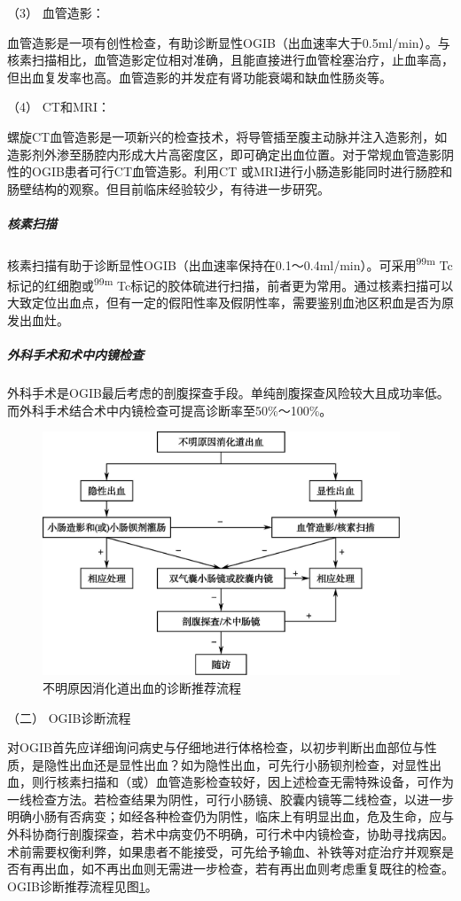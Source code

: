 \hypertarget{text00034.htmlux5cux23CHP1-13-3-1-1-3-3}{}
（3） 血管造影：

血管造影是一项有创性检查，有助诊断显性OGIB（出血速率大于0.5ml/min）。与核素扫描相比，血管造影定位相对准确，且能直接进行血管栓塞治疗，止血率高，但出血复发率也高。血管造影的并发症有肾功能衰竭和缺血性肠炎等。

\hypertarget{text00034.htmlux5cux23CHP1-13-3-1-1-3-4}{}
（4） CT和MRI：

螺旋CT血管造影是一项新兴的检查技术，将导管插至腹主动脉并注入造影剂，如造影剂外渗至肠腔内形成大片高密度区，即可确定出血位置。对于常规血管造影阴性的OGIB患者可行CT血管造影。利用CT
或MRI进行小肠造影能同时进行肠腔和肠壁结构的观察。但目前临床经验较少，有待进一步研究。

\subparagraph{核素扫描}

核素扫描有助于诊断显性OGIB（出血速率保持在0.1～0.4ml/min）。可采用\textsuperscript{99m}
Tc标记的红细胞或\textsuperscript{99m}
Tc标记的胶体硫进行扫描，前者更为常用。通过核素扫描可以大致定位出血点，但有一定的假阳性率及假阴性率，需要鉴别血池区积血是否为原发出血灶。

\subparagraph{外科手术和术中内镜检查}

外科手术是OGIB最后考虑的剖腹探查手段。单纯剖腹探查风险较大且成功率低。而外科手术结合术中内镜检查可提高诊断率至50\%～100\%。

\begin{figure}[!htbp]
 \centering
 \includegraphics[width=4.19792in,height=2.86458in]{./images/Image00060.jpg}
 \captionsetup{justification=centering}
 \caption{不明原因消化道出血的诊断推荐流程}
 \label{fig13-3}
  \end{figure} 

\hypertarget{text00034.htmlux5cux23CHP1-13-3-1-2}{}
（二） OGIB诊断流程

对OGIB首先应详细询问病史与仔细地进行体格检查，以初步判断出血部位与性质，是隐性出血还是显性出血？如为隐性出血，可先行小肠钡剂检查，对显性出血，则行核素扫描和（或）血管造影检查较好，因上述检查无需特殊设备，可作为一线检查方法。若检查结果为阴性，可行小肠镜、胶囊内镜等二线检查，以进一步明确小肠有否病变；如经各种检查仍为阴性，临床上有明显出血，危及生命，应与外科协商行剖腹探查，若术中病变仍不明确，可行术中内镜检查，协助寻找病因。术前需要权衡利弊，如果患者不能接受，可先给予输血、补铁等对症治疗并观察是否有再出血，如不再出血则无需进一步检查，若有再出血则考虑重复既往的检查。OGIB诊断推荐流程见图\ref{fig13-3}。

